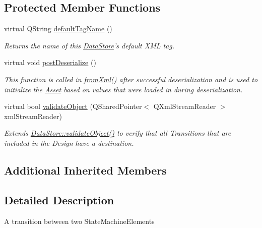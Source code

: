 \subsection*{Protected Member Functions}
\begin{DoxyCompactItemize}
\item 
virtual Q\-String \hyperlink{class_picto_1_1_transition_ae2e521a9d00d6c187553364484131538}{default\-Tag\-Name} ()
\begin{DoxyCompactList}\small\item\em Returns the name of this \hyperlink{class_picto_1_1_data_store}{Data\-Store}'s default X\-M\-L tag. \end{DoxyCompactList}\item 
virtual void \hyperlink{class_picto_1_1_transition_a6a2b3a1550acfd02ce687c4244b78137}{post\-Deserialize} ()
\begin{DoxyCompactList}\small\item\em This function is called in \hyperlink{class_picto_1_1_asset_a8bed4da09ecb1c07ce0dab313a9aba67}{from\-Xml()} after successful deserialization and is used to initialize the \hyperlink{class_picto_1_1_asset}{Asset} based on values that were loaded in during deserialization. \end{DoxyCompactList}\item 
\hypertarget{class_picto_1_1_transition_a3ea97a2146936adc89113e0325a6f91d}{virtual bool \hyperlink{class_picto_1_1_transition_a3ea97a2146936adc89113e0325a6f91d}{validate\-Object} (Q\-Shared\-Pointer$<$ Q\-Xml\-Stream\-Reader $>$ xml\-Stream\-Reader)}\label{class_picto_1_1_transition_a3ea97a2146936adc89113e0325a6f91d}

\begin{DoxyCompactList}\small\item\em Extends \hyperlink{class_picto_1_1_data_store_a077c9284e2d18d50b72e0fea1a5eeacb}{Data\-Store\-::validate\-Object()} to verify that all Transitions that are included in the Design have a destination. \end{DoxyCompactList}\end{DoxyCompactItemize}
\subsection*{Additional Inherited Members}


\subsection{Detailed Description}
A transition between two State\-Machine\-Elements

